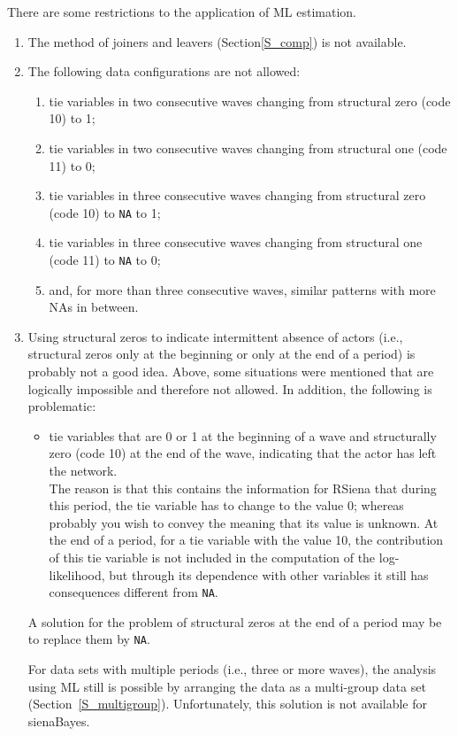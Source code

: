 \documentclass[a4paper,fleqn,11pt]{article}
\newcommand{\+}{\, + \,}
\newcommand{\RS}{{\sf \textsf{RSiena} }}
\begin{document}
There are some restrictions to the application of ML estimation.
\begin{enumerate}
  \item The method of joiners and leavers (Section\ref{S_comp})
is not available.
  \item The following data configurations are not allowed:
\begin{enumerate}
\item tie variables in two consecutive waves changing from
    structural zero (code 10) to 1;
\item tie variables in two consecutive waves changing from
    structural one (code 11) to 0;
\item tie variables in three consecutive waves changing from
    structural zero (code 10) to \texttt{NA} to 1;
\item tie variables in three consecutive waves changing from
    structural one (code 11) to \texttt{NA} to 0;
\item and, for more than three consecutive waves, similar patterns
    with more NAs in between.
\end{enumerate}
\item Using structural zeros to indicate intermittent absence of actors
    (i.e., structural zeros only at the beginning or only at the end
    of a period)   is probably not a good idea.
     Above, some situations were mentioned that are logically impossible
     and therefore not allowed.
     In addition, the following is problematic:
\begin{itemize}
\item tie variables that are 0 or 1 at the beginning of a wave and
      structurally zero (code 10) at the end of the wave,
      indicating that the actor has left the network.\\
      The reason is that this contains the information for \RS that during
      this period, the tie variable has to change to the value 0;
      whereas probably you wish to convey the meaning that its value
      is unknown. At the end of a period, for a tie variable with
      the value 10, the contribution of this tie variable is not included
      in the computation of the log-likelihood,
      but through its dependence with other
      variables it still has consequences different from \texttt{NA}.
\end{itemize}
A solution for the problem of structural zeros at the end
of a period may be to replace them by \texttt{NA}.

For data sets with multiple periods (i.e., three or more waves), the
analysis using ML still is possible
\citep[as proposed by][]{delaHayeETAl2017} by arranging the data
as a multi-group data set (Section~\ref{S_multigroup}).
Unfortunately, this solution is not available for
\textsf{sienaBayes}.
\end{enumerate}
\end{document}
